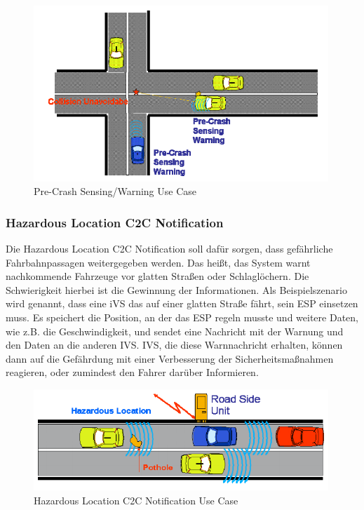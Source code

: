 \begin{figure}[htbp]
	\includegraphics[width=0.99\textwidth]{content/images/06_use_cases/pre_crash_sensing.png}
	\caption{Pre-Crash Sensing/Warning Use Case\cite{etsi102638}}
	\label{fig:pcs}
\end{figure}

\subsubsection{Hazardous Location C2C Notification}

Die Hazardous Location C2C Notification soll dafür sorgen, dass gefährliche Fahrbahnpassagen weitergegeben werden. Das heißt, das System warnt nachkommende Fahrzeuge vor glatten Straßen oder Schlaglöchern. Die Schwierigkeit hierbei ist die Gewinnung der Informationen. Als Beispielszenario wird genannt, dass eine \ac{iVS} das auf einer glatten Straße fährt, sein ESP einsetzen muss. Es speichert die Position, an der das ESP regeln musste und weitere Daten, wie z.B. die Geschwindigkeit, und sendet eine Nachricht mit der Warnung und den Daten an die anderen \ac{IVS}. \ac{IVS}, die diese Warnnachricht erhalten, können dann auf die Gefährdung mit einer Verbesserung der Sicherheitsmaßnahmen reagieren, oder zumindest den Fahrer darüber Informieren. 

\begin{figure}[htbp]
\includegraphics[width=0.99\textwidth]{content/images/06_use_cases/hln.png}
\caption{Hazardous Location C2C Notification Use Case\cite{etsi102638}}
\label{fig:hln}
\end{figure}

